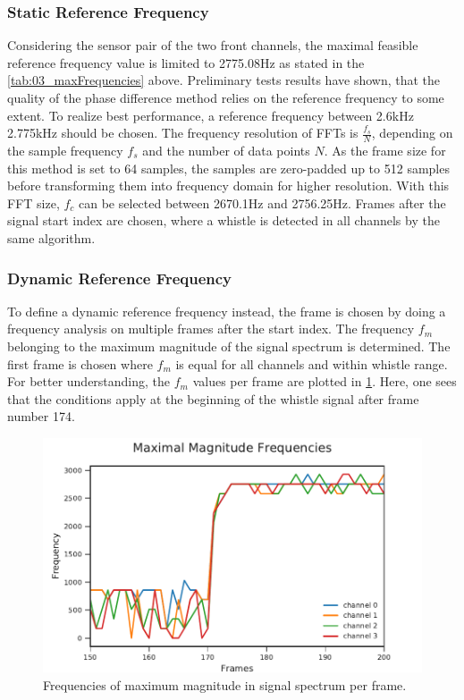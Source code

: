 \subsubsection*{Static Reference Frequency}

Considering the sensor pair of the two front channels, the maximal feasible
reference frequency value is limited to 2775.08\si{\hertz} as stated in the \cref{tab:03_maxFrequencies} above.
Preliminary tests results have shown, that the quality of the phase difference
method relies on the reference frequency to some extent.
To realize best performance, a reference frequency between 2.6\si{\kilo\hertz} 2.775\si{\kilo\hertz}
should be chosen.
The frequency resolution of \acp{FFT} is $\frac{f_s}{N}$, depending on the sample frequency $f_s$ and
the number of data points $N$.
As the frame size for this method is set to 64 samples, the samples are zero-padded
up to 512 samples before transforming them into frequency domain for higher resolution.
With this \ac{FFT} size, $f_c$ can be selected between 2670.1\si{\hertz} and 2756.25\si{\hertz}.
Frames after the signal start index are chosen, where a whistle is detected
in all channels by the same algorithm.

\subsubsection*{Dynamic Reference Frequency}

To define a dynamic reference frequency instead, the frame is chosen by doing a frequency analysis on
multiple frames after the start index.
The frequency $f_m$ belonging to the maximum magnitude of the signal spectrum
is determined.
The first frame is chosen where $f_m$ is equal for all channels and
within whistle range.
For better understanding, the $f_m$ values per frame are plotted in \cref{fig:03_maxFreq}.
Here, one sees that the conditions apply at the beginning of the whistle signal after frame number 174.

\begin{figure}[H]
	\centering
		\includegraphics[]{figures/maxFreq}
	\caption{Frequencies of maximum magnitude in signal spectrum per frame.}
    \label{fig:03_maxFreq}
\end{figure}
